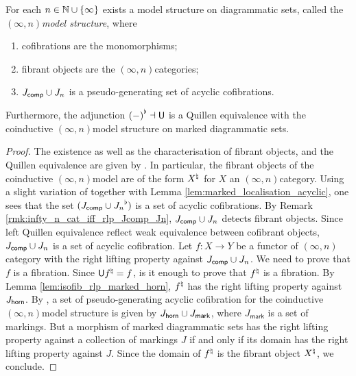 \begin{thm} \label{thm:n_model_structure_on_dgm_set}
    For each \( n \in \mathbb{N} \cup \left\{ {\infty} \right\} \) exists a model structure on diagrammatic sets, called the \emph{\( (\infty, n) \)\nbd model structure}, where
    \begin{enumerate}
        \item cofibrations are the monomorphisms;
        \item fibrant objects are the \( (\infty, n) \)\nbd categories;
        \item \( J_{\mathsf{comp}} \cup J_{n} \) is a pseudo-generating set of acyclic cofibrations.
    \end{enumerate}
    Furthermore, the adjunction \( {(-)}^{\flat} \dashv \mathsf{U} \) is a Quillen equivalence with the coinductive \( (\infty, n) \)\nbd model structure on marked diagrammatic sets.
\end{thm}
\begin{proof}
    The existence as well as the characterisation of fibrant objects, and the Quillen equivalence are given by \cite[3.27, Theorem 4.21, Theorem 4.23]{chanavat2024model}.
    In particular, the fibrant objects of the coinductive \( (\infty, n) \)\nbd model are of the form \( {X}^{\natural} \) for \( X \) an \( (\infty, n) \)\nbd category.
    Using a slight variation of \cite[Lemma 4.16, Lemma 4.17]{chanavat2024model} together with Lemma \ref{lem:marked_localisation_acyclic}, one sees that the set \( ({J_{\mathsf{comp}} \cup J_{n}}^{\flat}) \) is a set of acyclic cofibrations.
    By Remark \ref{rmk:infty_n_cat_iff_rlp_Jcomp_Jn}, \( J_{\mathsf{comp}} \cup J_{n} \) detects fibrant objects.
    Since left Quillen equivalence reflect weak equivalence between cofibrant objects, \( J_{\mathsf{comp}} \cup J_{n} \) is a set of acyclic cofibration.
    Let \( f \colon X \to Y \) be a functor of \( (\infty, n) \)\nbd category with the right lifting property against \( J_{\mathsf{comp}} \cup J_{n} \).
    We need to prove that \( f \) is a fibration.
    Since \( \mathsf{U}{f}^{\natural} = f \), is it enough to prove that \( {f}^{\natural} \) is a fibration. 
    By Lemma \ref{lem:isofib_rlp_marked_horn}, \( {f}^{\natural} \) has the right lifting property against \( J_{\mathsf{horn}} \).
    By \cite[Theorem 4.22]{chanavat2025gray}, a set of pseudo-generating acyclic cofibration for the coinductive \( (\infty, n) \)\nbd model structure is given by \( J_{\mathsf{horn}} \cup J_{\mathsf{mark}} \), where \( J_{\mathsf{mark}} \) is a set of markings.
    But a morphism of marked diagrammatic sets has the right lifting property against a collection of markings \( J \) if and only if its domain has the right lifting property against \( J \).
    Since the domain of \( {f}^{\natural} \) is the fibrant object \( {X}^{\natural} \), we conclude.
\end{proof}

